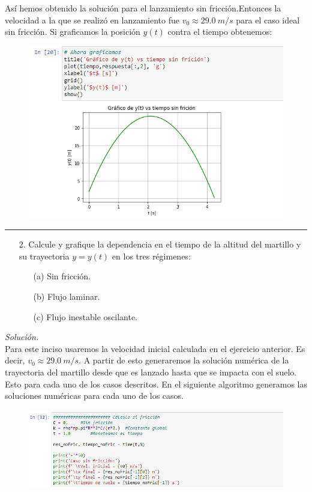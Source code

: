 \documentclass[11pt]{article}
\begin{document}
	Así hemos obtenido la solución para el lanzamiento sin fricción.Entonces la velocidad a la que se realizó en lanzamiento fue $v_0\approx\SI{29.0}{m/s}$ para el caso ideal sin fricción. Si graficamos la posición $y(t)$ contra el tiempo obtenemos:
\newpage
	\begin{figure}[h]
		\centering
		\includegraphics[width=12cm]{Img/8.PNG}
	\end{figure}
\hrule
	\begin{enumerate}
		\item [2.] Calcule y grafique la dependencia en el tiempo de la altitud del martillo y su trayectoria $y=y(t)$ en los tres régimenes:
		\begin{enumerate}
			\item [(a)] Sin fricción.
			\item [(b)] Flujo laminar.
			\item [(c)] Flujo inestable oscilante.
		\end{enumerate}
	\end{enumerate}
	\textit{Solución.}\\
	Para este inciso usaremos la velocidad inicial calculada en el ejercicio anterior. Es decir, $v_0\approx\SI{29.0}{m/s}$. A partir de esto generaremos la solución numérica de la trayectoria del martillo desde que es lanzado hasta que se impacta con el suelo. Esto para cada uno de los casos descritos. En el siguiente algoritmo generamos las soluciones numéricas para cada uno de los casos.
	\begin{figure}[h!]
		\centering
		\includegraphics[width=12cm]{Img/9.1.PNG}
	\end{figure}
\end{document}

